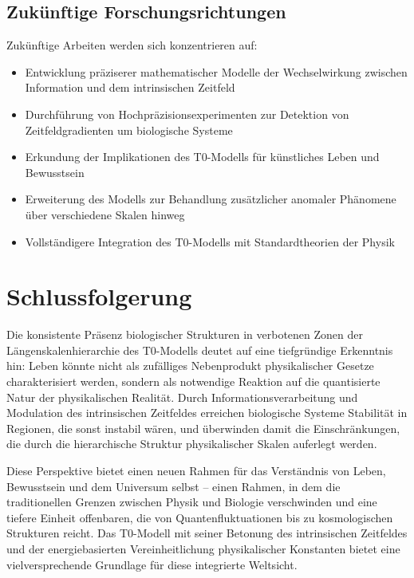 \documentclass[12pt,a4paper]{article}
\begin{document}
	\subsection{Zukünftige Forschungsrichtungen}
	\label{subsec:future_directions}
	
	Zukünftige Arbeiten werden sich konzentrieren auf:
	
	\begin{itemize}
		\item Entwicklung präziserer mathematischer Modelle der Wechselwirkung zwischen Information und dem intrinsischen Zeitfeld
		\item Durchführung von Hochpräzisionsexperimenten zur Detektion von Zeitfeldgradienten um biologische Systeme
		\item Erkundung der Implikationen des T0-Modells für künstliches Leben und Bewusstsein
		\item Erweiterung des Modells zur Behandlung zusätzlicher anomaler Phänomene über verschiedene Skalen hinweg
		\item Vollständigere Integration des T0-Modells mit Standardtheorien der Physik
	\end{itemize}
	
	\section{Schlussfolgerung}
	\label{sec:conclusion}
	
	Die konsistente Präsenz biologischer Strukturen in verbotenen Zonen der Längenskalenhierarchie des T0-Modells deutet auf eine tiefgründige Erkenntnis hin: Leben könnte nicht als zufälliges Nebenprodukt physikalischer Gesetze charakterisiert werden, sondern als notwendige Reaktion auf die quantisierte Natur der physikalischen Realität. Durch Informationsverarbeitung und Modulation des intrinsischen Zeitfeldes erreichen biologische Systeme Stabilität in Regionen, die sonst instabil wären, und überwinden damit die Einschränkungen, die durch die hierarchische Struktur physikalischer Skalen auferlegt werden.
	
	Diese Perspektive bietet einen neuen Rahmen für das Verständnis von Leben, Bewusstsein und dem Universum selbst – einen Rahmen, in dem die traditionellen Grenzen zwischen Physik und Biologie verschwinden und eine tiefere Einheit offenbaren, die von Quantenfluktuationen bis zu kosmologischen Strukturen reicht. Das T0-Modell mit seiner Betonung des intrinsischen Zeitfeldes und der energiebasierten Vereinheitlichung physikalischer Konstanten bietet eine vielversprechende Grundlage für diese integrierte Weltsicht.
	
\end{document}
